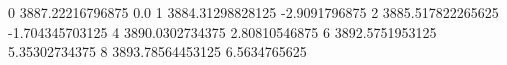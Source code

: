 0 3887.22216796875 0.0
1 3884.31298828125 -2.9091796875
2 3885.517822265625 -1.704345703125
4 3890.0302734375 2.80810546875
6 3892.5751953125 5.35302734375
8 3893.78564453125 6.5634765625
